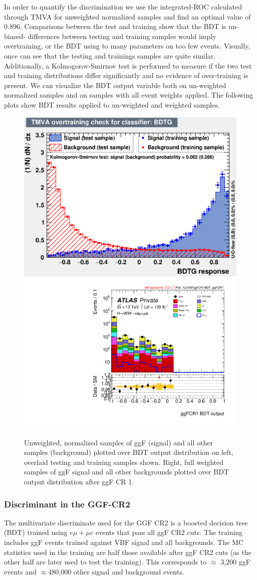 In order to quantify the discrimination we use the integrated-ROC calculated through TMVA for unweighted normalized samples and find an optimal value of 0.896. Comparisons between the test and training show that the BDT is un-biased- differences between testing and training samples would imply overtraining, or the BDT using to many parameters on too few events. Visually, once can see that the testing and trainings samples are quite similar. Additionally, a Kolmogorov-Smirnov test is performed to measure if the two test and training distributions differ significantly and no evidence of over-training is present. We can visualize the BDT output variable both on un-weighted normalized samples and on samples with all event weights applied. The following plots show BDT results applied to un-weighted and weighted samples.

\begin{figure}[!htbp]
\centering
  \includegraphics[width=.45\linewidth]{Pictures/overtrain_BDTG.eps}
  \includegraphics[width=.35\linewidth]{Pictures/run2-emme-CutVBFggFCR1-BDT_ggFCR1-log.pdf}
\caption{Unweighted, normalized samples of ggF (signal) and all other samples (background) plotted over BDT output distribution on left, overlaid testing and training samples shown. Right, full weighted samples of ggF signal and all other backgrounds plotted over BDT output distribution after ggF CR 1.}
\label{fig:ggFCR1BDTresult}
\end{figure}

\subsubsection{Discriminant in the GGF-CR2}

The multivariate discriminate used for the GGF CR2 is a boosted decision tree (BDT) trained using $e\mu+\mu e$ events that pass all ggF CR2 cuts. The training includes ggF events trained against VBF signal and all backgrounds. The MC statistics used in the training are half those available after ggF CR2 cuts (as the other half are later used to test the training). This corresponds to $\approx$ 3,200 ggF events and $\approx$480,000 other signal and background events.

